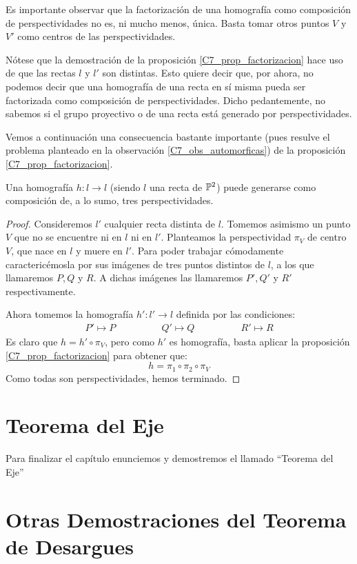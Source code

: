 \begin{obs}
	Es importante observar que la factorización de una homografía como composición de perspectividades no es, ni mucho menos, única. Basta tomar otros puntos $V$ y $V'$ como centros de las perspectividades.
\end{obs}
\begin{obs}
	\label{C7_obs_automorficas}
	Nótese que la demostración de la proposición \ref{C7_prop_factorizacion} hace uso de que las rectas $l$ y $l'$ son distintas. Esto quiere decir que, por ahora, no podemos decir que una homografía de una recta en sí misma pueda ser factorizada como composición de perspectividades. Dicho pedantemente, no sabemos si el grupo proyectivo o  de una recta está generado por perspectividades.
\end{obs}
Vemos a continuación una consecuencia bastante importante (pues resulve el problema planteado en la observación \ref{C7_obs_automorficas}) de la proposición \ref{C7_prop_factorizacion}.
\begin{cor}
	Una homografía $h:l\to l$ (siendo $l$ una recta de $\mathbb{P}^2$) puede generarse como composición de, a lo sumo, tres perspectividades.
\end{cor}
\begin{proof}
	Consideremos $l'$ cualquier recta distinta de $l$. Tomemos asimismo un punto $V$ que no se encuentre ni en $l$ ni en $l'$. Planteamos la perspectividad $\pi_V$ de centro $V$, que nace en $l$ y muere en $l'$. Para poder trabajar cómodamente caractericémosla por sus imágenes de tres puntos distintos de $l$, a los que llamaremos $P,Q$ y $R$. A dichas imágenes las llamaremos $P',Q'$ y $R'$ respectivamente.
	
	Ahora tomemos la homografía $h':l'\to l$ definida por las condiciones:
	\[\begin{array}{ccc}
	P'\mapsto P\qquad&\qquad
	Q'\mapsto Q\qquad&\qquad
	R'\mapsto R
	\end{array}\]
	Es claro que $h=h'\circ\pi_V$, pero como $h'$ es homografía, basta aplicar la proposición \ref{C7_prop_factorizacion} para obtener que:
	\[h=\pi_1\circ\pi_2\circ\pi_V\]
	Como todas son perspectividades, hemos terminado.
\end{proof}
\section{Teorema del Eje}
\label{C7_Eje}
Para finalizar el capítulo enunciemos y demostremos el llamado ``Teorema del Eje''
\section{Otras Demostraciones del Teorema de Desargues}